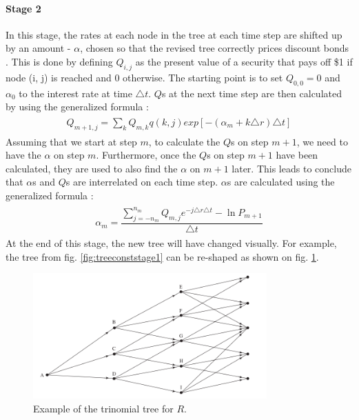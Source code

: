 \paragraph{Stage 2}
In this stage, the rates at each node in the tree at each time step are shifted up by an amount - $\alpha$, chosen so that the revised tree correctly prices discount bonds \cite[pg. 6]{uhwirt}. This is done by defining $Q_{i,j}$ as the present value of a security that pays off \$1 if node (i, j) is reached and 0 otherwise. The starting point is to set $Q_{0,0}=0$ and $\alpha_0$ to the interest rate at time $\triangle t$. $Q$s at the next time step are then calculated by using the generalized formula \cite[pg.705]{ofod}:  
\begin{equation}
\begin{gathered}
\begin{aligned}
Q_{m+1, j} = \sum_k Q_{m,k}q(k,j)exp[-(\alpha_m+k\triangle r)\triangle t]
\nonumber
\end{aligned}
\end{gathered}
\end{equation}
Assuming that we start at step $m$, to calculate the $Q$s on step $m+1$, we need to have the $\alpha$ on step $m$. Furthermore, once the $Q$s on step $m+1$ have been calculated, they are used to also find the $\alpha$ on $m+1$ later. This leads to conclude that $\alpha$s and $Q$s are interrelated on each time step. $\alpha$s are calculated using the generalized formula \cite[pg.703]{ofod}:
\begin{equation}
\begin{gathered}
\begin{aligned}
\alpha_{m} = \dfrac{\sum_{j=-n_m}^{n_m} Q_{m,j}e^{-j\triangle r\triangle t} - \ln{P_{m + 1}}}{\triangle t}
\nonumber
\end{aligned}
\end{gathered}
\end{equation}
At the end of this stage, the new tree will have changed visually. For example, the tree from fig. \ref{fig:treeconststage1} can be re-shaped as shown on fig. \ref{fig:treeconststage2}. 
\begin{figure}[H]
	\centering
	\includegraphics[width=0.8\textwidth]{img/treeconststage2.png}
	\caption{Example of the trinomial tree for $R$.}
	\label{fig:treeconststage2}
\end{figure}
